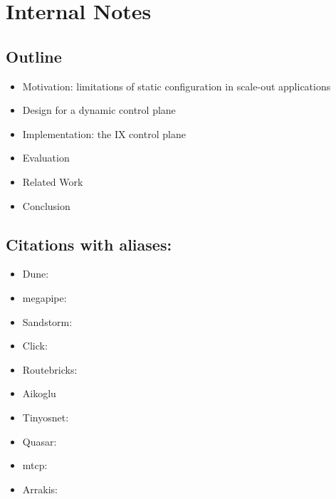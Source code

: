 
\section{Internal Notes}

\subsection{Outline}

\begin{itemize}
\item Motivation: limitations of static configuration in scale-out applications
\item Design for a dynamic control plane
\item Implementation: the IX control plane
\item Evaluation
\item Related Work
\item Conclusion
\end{itemize}


\subsection{Citations with aliases:}


\begin{itemize}
\item Dune: \cite{dune}
\item megapipe: \cite{megapipe}
\item Sandstorm: \cite{sandstorm}
\item Click: \cite{click}
\item Routebricks: \cite{routebricks}
\item Aikoglu \cite{Atikoglu:2012:WAL}
\item Tinyosnet: \cite{tinyosnet}
\item Quasar: \cite{quasar}
\item mtcp: \cite{mtcp}
\item Arrakis: \cite{arrakis-osdi}
\end{itemize}

